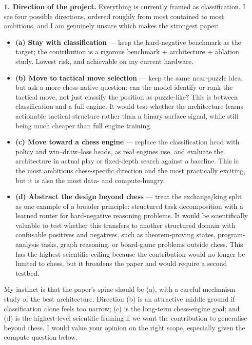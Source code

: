 \documentclass[11pt,a4paper]{article}
\begin{document}
\textbf{1. Direction of the project.} Everything is currently framed as classification.
I see four possible directions, ordered roughly from most contained to most ambitious, and
I am genuinely unsure which makes the strongest paper:
\begin{itemize}
  \item \textbf{(a) Stay with classification} --- keep the hard-negative benchmark as the
  target; the contribution is a rigorous benchmark + architecture + ablation study. Lowest
  risk, and achievable on my current hardware.
  \item \textbf{(b) Move to tactical move selection} --- keep the same near-puzzle idea,
  but ask a more chess-native question: can the model identify or rank the tactical move,
  not just classify the position as puzzle-like? This is between classification and a full
  engine. It would test whether the architecture learns actionable tactical structure
  rather than a binary surface signal, while still being much cheaper than full engine
  training.
  \item \textbf{(c) Move toward a chess engine} --- replace the classification head with
  policy and win--draw--loss heads, as real engines use, and evaluate the architecture in
  actual play or fixed-depth search against a baseline. This is the most ambitious
  chess-specific direction and the most practically exciting, but it is also the most
  data- and compute-hungry.
  \item \textbf{(d) Abstract the design beyond chess} --- treat the exchange/king split
  as one example of a broader principle: structured task decomposition with a learned
  router for hard-negative reasoning problems. It would be scientifically valuable to test
  whether this transfers to another structured domain with confusable positives and
  negatives, such as theorem-proving states, program-analysis tasks, graph reasoning, or
  board-game problems outside chess. This has the highest scientific ceiling because the
  contribution would no longer be limited to chess, but it broadens the paper and would
  require a second testbed.
\end{itemize}
My instinct is that the paper's spine should be (a), with a careful mechanism study of the
best architecture. Direction (b) is an attractive middle ground if classification alone
feels too narrow; (c) is the long-term chess-engine goal; and (d) is the highest-level
scientific framing if we want the contribution to generalise beyond chess. I would value
your opinion on the right scope, especially given the compute question below.
\end{document}
